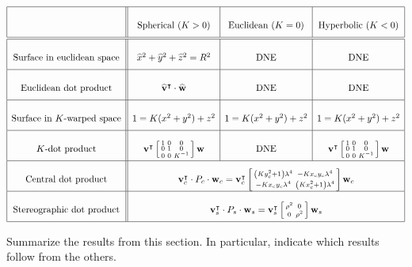 \documentclass[newpage,hints,handout]{ximera}
\begin{document}
\[
  {\renewcommand{\arraystretch}{2.7}
  \begin{array}{|c||c|c|c|}\hline
    & \text{Spherical (}K>0) & \text{Euclidean (}K=0) & \text{Hyperbolic (}K<0)\\
    \hline\hline
    \text{Surface in euclidean space}
    & \hat{x}^{2}+\hat{y}^{2}+\hat{z}^{2}=R^{2} & \text{DNE}  & \text{DNE} \\\hline
    \text{Euclidean dot product} & \hat{\mathbf v}^\transpose\cdot \hat{\mathbf w}
                             & \text{DNE}  & \text{DNE}\\\hline
    \text{Surface in $K$-warped space}
    & {1=K(x^{2}+y^{2})+z^{2}} & 1=K(x^{2}+y^{2})+z^{2} & 1=K(x^{2}+y^{2})+z^{2}\\\hline
    K\text{-dot product}
    & \mathbf v^\transpose \left[\begin{smallmatrix}
        1 & 0 & 0\\
        0 & 1 & 0\\
        0 & 0 & K^{-1}
      \end{smallmatrix}\right] \mathbf w &  \text{DNE}
    & \mathbf{v}^\transpose \left[\begin{smallmatrix}1 & 0 & 0\\ 0 & 1 & 0\\ 0 & 0 & K^{-1}\end{smallmatrix}\right]\mathbf w \\\hline
    \text{Central dot product} & \multicolumn{3}{c|}{
        \mathbf{v}_c^\transpose \cdot P_c \cdot \mathbf{w}_c
        = \mathbf{v}_c^\transpose\left[\begin{smallmatrix}
            \left(Ky_c^2+1\right)\lambda^4 & -Kx_{c}y_{c}\lambda^4 \\
            -Kx_{c}y_{c}\lambda^4 & \left(Kx_c^2+1\right)\lambda^4
          \end{smallmatrix}\right] \mathbf{w}_c}\\\hline
    \text{Stereographic dot product} & \multicolumn{3}{c|}{
        \mathbf{v}_s^\transpose\cdot P_s\cdot \mathbf{w}_s
        = \mathbf{v}_s^\transpose\left[\begin{smallmatrix}
            \rho^2 & 0\\ 0 & \rho^2
          \end{smallmatrix}\right] \mathbf{w}_s}\\\hline
\end{array}}
\]





\begin{problem}
Summarize the results from this section. In particular, indicate which
results follow from the others.
\begin{freeResponse}
\end{freeResponse}
\end{problem}
\end{document}
